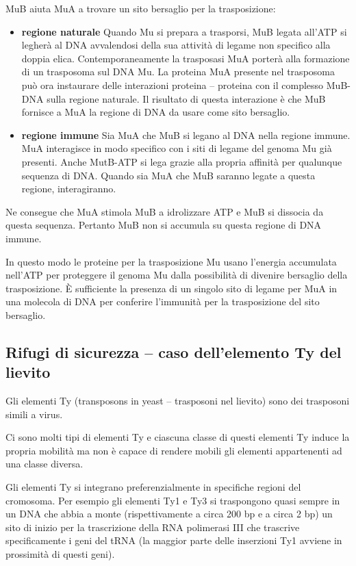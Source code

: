 \documentclass[11pt]{book}
\begin{document}
MuB aiuta MuA a trovare un sito bersaglio per la trasposizione:

\begin{itemize}
\itemsep1pt\parskip0pt
\item
  \textbf{regione naturale} Quando Mu si prepara a trasporsi, MuB legata
  all'ATP si legherà al DNA avvalendosi della sua attività di legame non
  specifico alla doppia elica. Contemporaneamente la trasposasi MuA
  porterà alla formazione di un trasposoma sul DNA Mu. La proteina MuA
  presente nel trasposoma può ora instaurare delle interazioni proteina
  -- proteina con il complesso MuB-DNA sulla regione naturale. Il
  risultato di questa interazione è che MuB fornisce a MuA la regione di
  DNA da usare come sito bersaglio.
\item
  \textbf{regione immune} Sia MuA che MuB si legano al DNA nella regione
  immune. MuA interagisce in modo specifico con i siti di legame del
  genoma Mu già presenti. Anche MutB-ATP si lega grazie alla propria
  affinità per qualunque sequenza di DNA. Quando sia MuA che MuB saranno
  legate a questa regione, interagiranno.
\end{itemize}

Ne consegue che MuA stimola MuB a idrolizzare ATP e MuB si dissocia da
questa sequenza. Pertanto MuB non si accumula su questa regione di DNA
immune.

In questo modo le proteine per la trasposizione Mu usano l'energia
accumulata nell'ATP per proteggere il genoma Mu dalla possibilità di
divenire bersaglio della trasposizione. È sufficiente la presenza di un
singolo sito di legame per MuA in una molecola di DNA per conferire
l'immunità per la trasposizione del sito bersaglio.

\subsection{Rifugi di sicurezza -- caso dell'elemento Ty del
lievito}\label{rifugi-di-sicurezza-caso-dellelemento-ty-del-lievito}

Gli elementi Ty (transposons in yeast -- trasposoni nel lievito) sono
dei trasposoni simili a virus.

Ci sono molti tipi di elementi Ty e ciascuna classe di questi elementi
Ty induce la propria mobilità ma non è capace di rendere mobili gli
elementi appartenenti ad una classe diversa.

Gli elementi Ty si integrano preferenzialmente in specifiche regioni del
cromosoma. Per esempio gli elementi Ty1 e Ty3 si traspongono quasi
sempre in un DNA che abbia a monte (rispettivamente a circa 200 bp e a
circa 2 bp) un sito di inizio per la trascrizione della RNA polimerasi
III che trascrive specificamente i geni del tRNA (la maggior parte delle
inserzioni Ty1 avviene in prossimità di questi geni).
\end{document}
